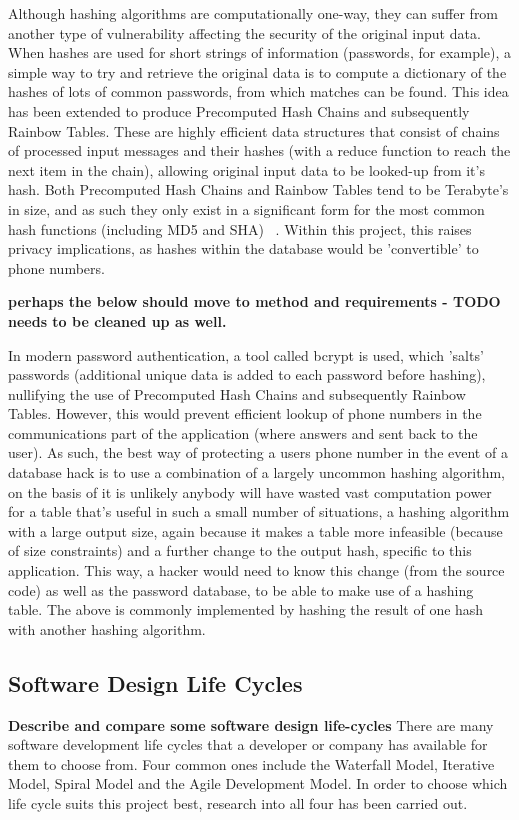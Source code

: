 \documentclass{article}
\begin{document}
Although hashing algorithms are computationally one-way, they can suffer from another type of vulnerability affecting the security of the original input data.  When hashes are used for short strings of information (passwords, for example), a simple way to try and retrieve the original data is to compute a dictionary of the hashes of lots of common passwords, from which matches can be found.  This idea has been extended to produce Precomputed Hash Chains and subsequently Rainbow Tables.  These are highly efficient data structures that consist of chains of processed input messages and their hashes (with a reduce function to reach the next item in the chain), allowing original input data to be looked-up from it's hash.  Both Precomputed Hash Chains and Rainbow Tables tend to be Terabyte's in size, and as such they only exist in a significant form for the most common hash functions (including MD5 and SHA) ~\cite{Teat:2011:SCH:2016039.2016072}.  Within this project, this raises privacy implications, as hashes within the database would be 'convertible' to phone numbers.  

{\bf perhaps the below should move to method and requirements - TODO needs to be cleaned up as well.}

In modern password authentication, a tool called bcrypt is used, which 'salts' passwords (additional unique data is added to each password before hashing), nullifying the use of Precomputed Hash Chains and subsequently Rainbow Tables.  However, this would prevent efficient lookup of phone numbers in the communications part of the application (where answers and sent back to the user).  As such, the best way of protecting a users phone number in the event of a database hack is to use a combination of a largely uncommon hashing algorithm, on the basis of it is unlikely anybody will have wasted vast computation power for a table that's useful in such a small number of situations, a hashing algorithm with a large output size, again because it makes a table more infeasible (because of size constraints) and a further change to the output hash, specific to this application.  This way, a hacker would need to know this change (from the source code) as well as the password database, to be able to make use of a hashing table.  The above is commonly implemented by hashing the result of one hash with another hashing algorithm.

\subsection{Software Design Life Cycles}
{\bf Describe and compare some software design life-cycles} %
There are many software development life cycles that a developer or company has available for them to choose from.  Four common ones include the Waterfall Model, Iterative Model, Spiral Model and the Agile Development Model.  In order to choose which life cycle suits this project best, research into all four has been carried out.
\end{document}
